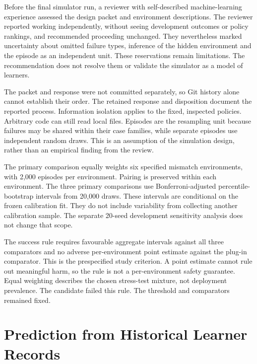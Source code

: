 Before the final simulator run, a reviewer with self-described machine-learning experience assessed the design packet and
environment descriptions. The reviewer reported working independently, without seeing development outcomes or policy
rankings, and recommended proceeding unchanged. They nevertheless marked uncertainty
about omitted failure types, inference of the hidden environment and the episode as an independent unit. These reservations
remain limitations. The recommendation does not resolve them or validate the simulator as a model of learners.

The packet and response were not committed separately, so Git history alone cannot establish their order. The retained
response and disposition document the reported process. Information isolation applies to the fixed, inspected policies.
Arbitrary code can still read local files. Episodes are the resampling unit because failures
may be shared within their case families, while separate episodes use independent random draws. This is an assumption of
the simulation design, rather than an empirical finding from the review.

The primary comparison equally weights six specified mismatch environments, with 2,000 episodes per environment.
Pairing is preserved within each environment. The three primary comparisons use Bonferroni-adjusted percentile-bootstrap
intervals from 20,000 draws. These intervals are conditional on the frozen calibration fit. They do not include variability
from collecting another calibration sample. The separate 20-seed development sensitivity analysis does not change that scope.

The success rule requires favourable aggregate intervals against all three comparators and no adverse per-environment point
estimate against the plug-in comparator. This is the prespecified study criterion. A point estimate cannot rule out meaningful
harm, so the rule is not a per-environment safety guarantee. Equal weighting describes the chosen stress-test mixture, not
deployment prevalence. The candidate failed this rule. The threshold and comparators remained fixed.

\section{Prediction from Historical Learner Records}

